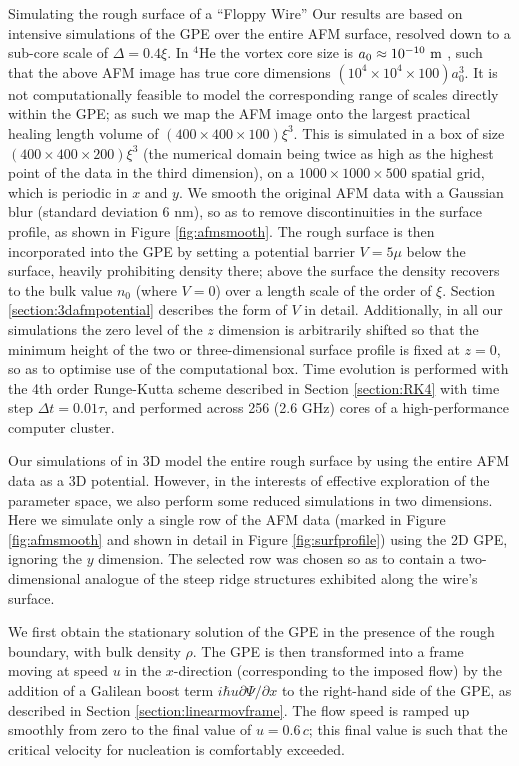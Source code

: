 \begin{chapter}{\label{cha:afm}Simulating the rough surface of a ``Floppy Wire''}
Our results are based on intensive simulations of the GPE over the entire AFM surface, resolved down to a sub-core scale of $\Delta=0.4\xi$. In $^4$He the vortex core size is $a_0 \approx 10^{-10}~\rm m$ \cite{Rayfield1964}, such that the above AFM image has true core dimensions $(10^4 \times 10^4 \times 100) a_0^3$.  It is not computationally feasible to model the corresponding range of scales directly within the GPE; as such we map the AFM image onto the largest practical healing length volume of $(400 \times 400 \times 100) \xi^3$.  This is simulated in a box of size $(400 \times 400 \times 200) \xi^3$ (the numerical domain being twice as high as the highest point of the data in the third dimension), on a $1000\times 1000\times 500$ spatial grid, which is periodic in $x$ and $y$.  We smooth the original AFM data with a Gaussian blur (standard deviation 6 nm), so as to remove discontinuities in the surface profile, as shown in Figure \ref{fig:afmsmooth}. The rough surface is then incorporated into the GPE by setting a potential barrier $V=5\mu$ below the surface, heavily prohibiting density there; above the surface the density recovers to the bulk value $n_0$ (where $V=0$) over a length scale of the order of $\xi$. Section \ref{section:3dafmpotential} describes the form of $V$ in detail. Additionally, in all our simulations the zero level of the $z$ dimension is arbitrarily shifted so that the minimum height of the two or three-dimensional surface profile is fixed at $z=0$, so as to optimise use of the computational box. Time evolution is performed with the 4th order Runge-Kutta scheme described in Section \ref{section:RK4} with time step $\Delta t=0.01 \tau $, and performed across 256 (2.6 GHz) cores of a high-performance {computer} cluster.

Our simulations of in 3D model the entire rough surface by using the entire AFM data as a 3D potential. However, in the interests of effective exploration of the parameter space, we also perform some reduced simulations in two dimensions. Here we simulate only a single row of the AFM data (marked in Figure \ref{fig:afmsmooth} and shown in detail in Figure \ref{fig:surfprofile}) using the 2D GPE, ignoring the $y$ dimension. The selected row was chosen so as to contain a two-dimensional analogue of the steep ridge structures exhibited along the wire's surface.

We first obtain the stationary solution of the GPE in the presence of
the rough boundary, with bulk density $\rho$.  The GPE is then transformed into a frame moving at speed $u$ in the $x$-direction (corresponding to the imposed flow) by the addition of a Galilean boost term $ i \hbar u \partial \Psi/\partial x$ to the right-hand side of the GPE, as described in Section \ref{section:linearmovframe}.  The flow speed {is}  ramped up smoothly from zero to the final value of $u=0.6\,c$; this final value is such that the critical velocity for nucleation is comfortably exceeded. 


\end{chapter}
